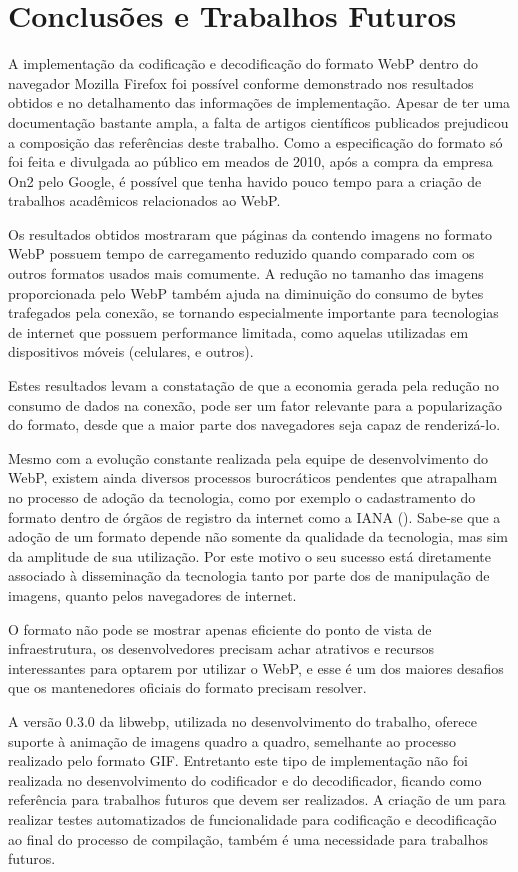 \documentclass[espaco=simples,appendix=Name]{abnt}
\begin{document}
\chapter{Conclusões e Trabalhos Futuros}

A implementação da codificação e decodificação do formato WebP dentro do navegador Mozilla Firefox foi possível conforme demonstrado nos resultados obtidos e no detalhamento das informações de implementação. Apesar de ter uma documentação bastante ampla, a falta de artigos científicos publicados prejudicou a composição das referências deste trabalho. Como a especificação do formato só foi feita e divulgada ao público em meados de 2010, após a compra da empresa On2 pelo Google, é possível que tenha havido pouco tempo para a criação de trabalhos acadêmicos relacionados ao WebP.

Os resultados obtidos mostraram que páginas da  contendo imagens no formato WebP possuem tempo de carregamento reduzido quando comparado com os outros formatos usados mais comumente. A redução no tamanho das imagens proporcionada pelo WebP também ajuda na diminuição do consumo de bytes trafegados pela conexão, se tornando especialmente importante para tecnologias de internet que possuem performance limitada, como aquelas utilizadas em dispositivos móveis (celulares,  e outros). 

Estes resultados levam a constatação de que a economia gerada pela redução no consumo de dados na conexão, pode ser um fator relevante para a popularização do formato, desde que a maior parte dos navegadores seja capaz de renderizá-lo.

Mesmo com a evolução constante realizada pela equipe de desenvolvimento do WebP, existem ainda diversos processos burocráticos pendentes que atrapalham no processo de adoção da tecnologia, como por exemplo o cadastramento do formato dentro de órgãos de registro da internet como a IANA (). Sabe-se que a adoção de um formato depende não somente da qualidade da tecnologia, mas sim da amplitude de sua utilização. Por este motivo o seu sucesso está diretamente associado à disseminação da tecnologia tanto por parte dos  de manipulação de imagens, quanto pelos navegadores de internet. 

O formato não pode se mostrar apenas eficiente do ponto de vista de infraestrutura, os desenvolvedores precisam achar atrativos e recursos interessantes para optarem por utilizar o WebP, e esse é um dos maiores desafios que os mantenedores oficiais do formato precisam resolver.

A versão 0.3.0 da libwebp, utilizada no desenvolvimento do trabalho, oferece suporte à animação de imagens quadro a quadro, semelhante ao processo realizado pelo formato GIF. Entretanto este tipo de implementação não foi realizada no desenvolvimento do codificador e do decodificador, ficando como referência para trabalhos futuros que devem ser realizados. A criação de um  para realizar testes automatizados de funcionalidade para codificação e decodificação ao final do processo de compilação, também é uma necessidade para trabalhos futuros.


\end{document}
